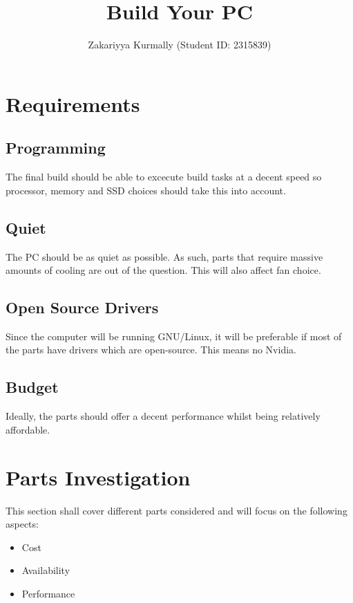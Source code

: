 \documentclass[12pt, a4paper]{article}
\title{Build Your PC}
\author{Zakariyya Kurmally (Student ID: 2315839)}
\begin{document}
\maketitle
\pagebreak
\tableofcontents
\pagebreak


\section{Requirements}

\subsection{Programming}
The final build should be able to excecute build tasks at a decent speed
so processor, memory and SSD choices should take this into account.

\subsection{Quiet}
The PC should be as quiet as possible. As such, parts that require 
massive amounts of cooling are out of the question. This will also
affect fan choice.

\subsection{Open Source Drivers}
Since the computer will be running GNU/Linux, it will be preferable if most of 
the parts have drivers which are open-source. This means no Nvidia.

\subsection{Budget}
Ideally, the parts should offer a decent performance whilst being
relatively affordable.



\section{Parts Investigation}
This section shall cover different parts considered and will focus on the 
following aspects:
\begin{itemize}
  \item Cost 
  \item Availability 
  \item Performance
\end{itemize}
\end{document}
